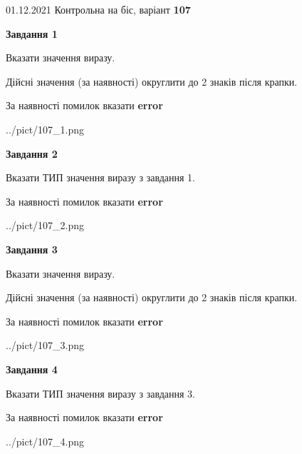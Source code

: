 \documentclass[11pt, ukrainian]{article}
\begin{document}
{01.12.2021 Контрольна на біс, варіант  \No \textbf { 107 }\par}
{
\begin {large}
{\begin {center}\textbf{Завдання 1}\end {center}}\par
Вказати значення виразу. \par
Дійсні значення (за наявності) округлити до 2 знаків після крапки. \par
За наявності помилок вказати \textbf{error}

\begin{center}
	{../pict/107_1.png}
\end{center}
\newpage

{\begin {center}\textbf{Завдання 2}\end {center}}\par
Вказати ТИП значення виразу з завдання 1. \par
За наявності помилок вказати \textbf{error}

\begin{center}
	{../pict/107_2.png}
\end{center}
\newpage

{\begin {center}\textbf{Завдання 3}\end {center}}\par
Вказати значення виразу. \par
Дійсні значення (за наявності) округлити до 2 знаків після крапки. \par
За наявності помилок вказати \textbf{error}

\begin{center}
	{../pict/107_3.png}
\end{center}
\newpage

{\begin {center}\textbf{Завдання 4}\end {center}}\par
Вказати ТИП значення виразу з завдання 3. \par
За наявності помилок вказати \textbf{error}

\begin{center}
	{../pict/107_4.png}
\end{center}
\newpage


\end{large}}
\end{document}
